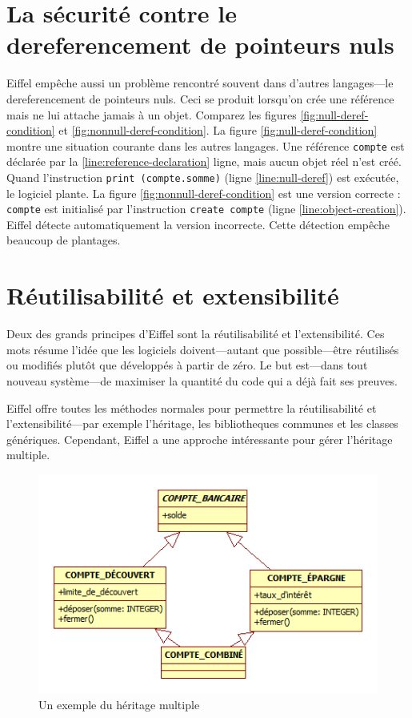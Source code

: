 \documentclass[french]{report}
\begin{document}
\section{La sécurité contre le \gls{dereferencement} de pointeurs nuls}

Eiffel empêche aussi un problème rencontré souvent dans d'autres langages---le \gls{dereferencement} de pointeurs nuls. Ceci se produit lorsqu'on crée une référence mais ne lui attache jamais à un objet. Comparez les figures \ref{fig:null-deref-condition} et \ref{fig:nonnull-deref-condition}. La figure \ref{fig:null-deref-condition} montre une situation courante dans les autres langages. Une référence \texttt{compte} est déclarée par la \ref{line:reference-declaration}\ieme{} ligne, mais aucun objet réel n'est créé. Quand l'instruction \texttt{print (compte.somme)} (ligne \ref{line:null-deref}) est exécutée, le logiciel plante. La figure \ref{fig:nonnull-deref-condition} est une version correcte : \texttt{compte} est initialisé par l'instruction \texttt{create compte} (ligne \ref{line:object-creation}). Eiffel détecte automatiquement la version incorrecte. Cette détection empêche beaucoup de plantages.

\section{Réutilisabilité et extensibilité}

Deux des grands principes d'Eiffel sont la réutilisabilité et l'extensibilité\cite{eiffelextensibility}. Ces mots résume l'idée que les logiciels doivent---autant que possible---être réutilisés ou modifiés plutôt que développés à partir de zéro. Le but est---dans tout nouveau système---de maximiser la quantité du code qui a déjà fait ses preuves.

Eiffel offre toutes les méthodes normales pour permettre la réutilisabilité et l'extensibilité---par exemple l'héritage, les \glspl{bibliotheque} communes et les classes génériques. Cependant, Eiffel a une approche intéressante pour gérer l'héritage multiple.

\begin{figure}[h]
	\centering
	\includegraphics[width=0.7\linewidth]{multiple_inheritance}
	\caption{Un exemple du héritage multiple}
	\label{fig:multiple-inheritance}
\end{figure}
\end{document}
